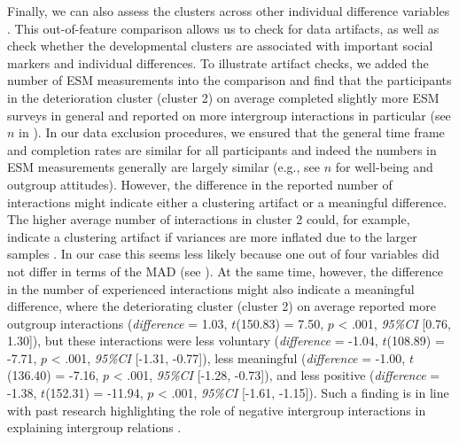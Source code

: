 Finally, we can also assess the clusters across other individual
difference variables \citep[e.g.,][]{monden2022}. This out-of-feature
comparison allows us to check for data artifacts, as well as check
whether the developmental clusters are associated with important social
markers and individual differences. To illustrate artifact checks, we
added the number of ESM measurements into the comparison and find that
the participants in the deterioration cluster (cluster 2) on average
completed slightly more ESM surveys in general and reported on more
intergroup interactions in particular (see \(n\) in
). In our data exclusion procedures, we
ensured that the general time frame and completion rates are similar for
all participants and indeed the numbers in ESM measurements generally
are largely similar (e.g., see \(n\) for well-being and outgroup
attitudes). However, the difference in the reported number of
interactions might indicate either a clustering artifact or a meaningful
difference. The higher average number of interactions in cluster 2
could, for example, indicate a clustering artifact if variances are more
inflated due to the larger samples \citep{kogan2006}. In our case this
seems less likely because one out of four variables did not differ in
terms of the MAD (see ). At the same
time, however, the difference in the number of experienced interactions
might also indicate a meaningful difference, where the deteriorating
cluster (cluster 2) on average reported more outgroup interactions
(\textit{difference} = 1.03, \(t\)(150.83) = 7.50, \(p\) \textless{}
.001, \textit{95\%CI} {[}0.76, 1.30{]}), but these interactions were
less voluntary (\textit{difference} = -1.04, \(t\)(108.89) = -7.71,
\(p\) \textless{} .001, \textit{95\%CI} {[}-1.31, -0.77{]}), less
meaningful (\textit{difference} = -1.00, \(t\)(136.40) = -7.16, \(p\)
\textless{} .001, \textit{95\%CI} {[}-1.28, -0.73{]}), and less positive
(\textit{difference} = -1.38, \(t\)(152.31) = -11.94, \(p\) \textless{}
.001, \textit{95\%CI} {[}-1.61, -1.15{]}). Such a finding is in line
with past research highlighting the role of negative intergroup
interactions in explaining intergroup relations
\citep[e.g.,][]{Barlow2012, Prati2021, Graf2014}.

